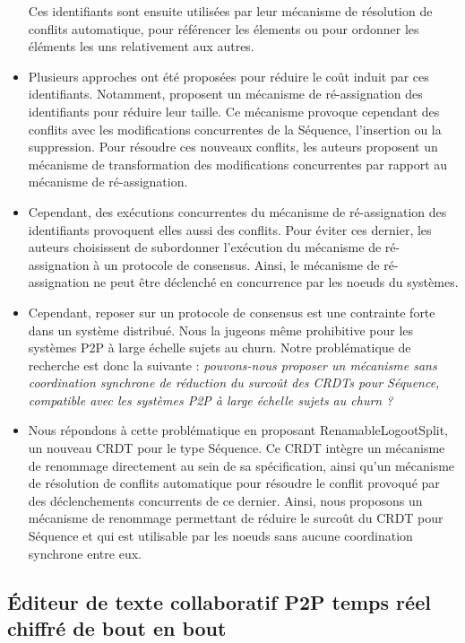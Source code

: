 \begin{itemize}
        Ces identifiants sont ensuite utilisées par leur mécanisme de résolution de conflits automatique, \eg pour référencer les élements ou pour ordonner les éléments les uns relativement aux autres.
    \item Plusieurs approches ont été proposées pour réduire le coût induit par ces identifiants.
        Notamment, \cite{letia:hal-01248270,zawirski:hal-01248197} proposent un mécanisme de ré-assignation des identifiants pour réduire leur taille.
        Ce mécanisme provoque cependant des conflits avec les modifications concurrentes de la Séquence, \ie l'insertion ou la suppression.
        Pour résoudre ces nouveaux conflits, les auteurs proposent un mécanisme de transformation des modifications concurrentes par rapport au mécanisme de ré-assignation.
    \item Cependant, des exécutions concurrentes du mécanisme de ré-assignation des identifiants provoquent elles aussi des conflits.
        Pour éviter ces dernier, les auteurs choisissent de subordonner l'exécution du mécanisme de ré-assignation à un protocole de consensus.
        Ainsi, le mécanisme de ré-assignation ne peut être déclenché en concurrence par les noeuds du systèmes.
    \item Cependant, reposer sur un protocole de consensus est une contrainte forte dans un système distribué.
        Nous la jugeons même prohibitive pour les systèmes \ac{P2P} à large échelle sujets au churn.
        Notre problématique de recherche est donc la suivante : \emph{pouvons-nous proposer un mécanisme sans coordination synchrone de réduction du surcoût des \acp{CRDT} pour Séquence, \ie compatible avec les systèmes \ac{P2P} à large échelle sujets au churn ?}
    \item Nous répondons à cette problématique en proposant RenamableLogootSplit, un nouveau \ac{CRDT} pour le type Séquence.
        Ce \ac{CRDT} intègre un mécanisme de renommage directement au sein de sa spécification, ainsi qu'un mécanisme de résolution de conflits automatique pour résoudre le conflit provoqué par des déclenchements concurrents de ce dernier.
        Ainsi, nous proposons un mécanisme de renommage permettant de réduire le surcoût du \ac{CRDT} pour Séquence et qui est utilisable par les noeuds sans aucune coordination synchrone entre eux.
\end{itemize}

\subsection{Éditeur de texte collaboratif \ac{P2P} temps réel chiffré de bout en bout}

